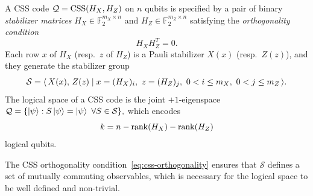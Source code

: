\begin{definition}\label{def:css}
A CSS code $\mathcal Q = \mathrm{CSS}(H_X, H_Z)$ on $n$ qubits is specified by a pair of binary \emph{stabilizer matrices} $H_X \in \mathbb F_2^{m_X\times n}$ and $H_Z\in \mathbb F_2^{m_Z\times n}$ satisfying the \emph{orthogonality condition}
\begin{equation}\label{eq:css-orthogonality}
    H_X H_Z^T = 0 .
\end{equation}
Each row $x$ of $H_X$ (resp.\ $z$ of $H_Z$) is a Pauli stabilizer $X(x)$ (resp.\ $Z(z)$), and they generate the stabilizer group
\[
\mathcal S = \langle \, X(x),\, Z(z) \;|\; x = (H_X)_i,\ z = (H_Z)_j,\ 0<i\leq m_X,\ 0<j\leq m_Z\, \rangle.
\]
The logical space of a CSS code is the joint $+1$-eigenspace
$
\mathcal Q = \{\ket \psi : S\ket\psi = \ket \psi \ \forall S \in \mathcal S\},
$
which encodes
\begin{equation}\label{eq:css-k}
    k = n - \mathrm{rank}(H_X) - \mathrm{rank}(H_Z)
\end{equation}
logical qubits.
\end{definition}

The CSS orthogonality condition~\eqref{eq:css-orthogonality} ensures that $\mathcal S$ defines a set of mutually commuting observables, which is necessary for the logical space to be well defined and non-trivial.


